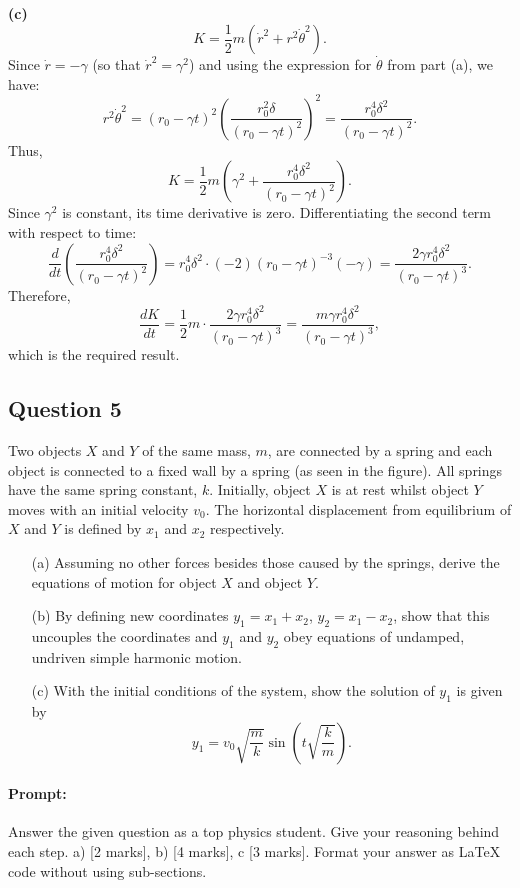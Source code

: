 \documentclass{article}
\begin{document}
\textbf{(c)} \quad {}
\[
K = \frac{1}{2} m \left(\dot{r}^2 + r^2 \dot{\theta}^2\right).
\]
Since \(\dot{r} = -\gamma\) (so that \(\dot{r}^2 = \gamma^2\)) and using the expression for \(\dot{\theta}\) from part (a), we have:
\[
r^2 \dot{\theta}^2 = (r_0-\gamma t)^2 \left(\frac{r_0^2 \delta}{(r_0-\gamma t)^2}\right)^2
= \frac{r_0^4 \delta^2}{(r_0-\gamma t)^2}.
\]
Thus,
\[
K = \frac{1}{2} m \left(\gamma^2 + \frac{r_0^4 \delta^2}{(r_0-\gamma t)^2}\right).
\]
Since \(\gamma^2\) is constant, its time derivative is zero. Differentiating the second term with respect to time:
\[
\frac{d}{dt}\left(\frac{r_0^4 \delta^2}{(r_0-\gamma t)^2}\right)
= r_0^4 \delta^2 \cdot (-2)(r_0-\gamma t)^{-3}(-\gamma)
= \frac{2\gamma r_0^4 \delta^2}{(r_0-\gamma t)^3}.
\]
Therefore, 
\[
\frac{dK}{dt} = \frac{1}{2} m \cdot \frac{2\gamma r_0^4 \delta^2}{(r_0-\gamma t)^3}
= \frac{m \gamma r_0^4 \delta^2}{(r_0-\gamma t)^3},
\]
which is the required result.

\subsection{Question 5}

Two objects $X$ and $Y$ of the same mass, $m$, are connected by a spring and each object is connected to a fixed wall by a spring (as seen in the figure). All springs have the same spring constant, $k$. Initially, object $X$ is at rest whilst object $Y$ moves with an initial velocity $v_0$. The horizontal displacement from equilibrium of $X$ and $Y$ is defined by $x_1$ and $x_2$ respectively.

\begin{enumerate}
    \item[(a)] Assuming no other forces besides those caused by the springs, derive the equations of motion for object $X$ and object $Y$.
    \item[(b)] By defining new coordinates $y_1 = x_1 + x_2$, $y_2 = x_1 - x_2$, show that this uncouples the coordinates and $y_1$ and $y_2$ obey equations of undamped, undriven simple harmonic motion.
    \item[(c)] With the initial conditions of the system, show the solution of $y_1$ is given by
    \[
    y_1 = v_0 \sqrt{\frac{m}{k}} \sin\left(t \sqrt{\frac{k}{m}}\right).
    \]
\end{enumerate}

\paragraph{Prompt: \\} 
Answer the given question as a top physics student. Give your reasoning behind each step. a) [2 marks], b) [4 marks], c [3 marks].
Format your answer as LaTeX code without using sub-sections.
\end{document}

